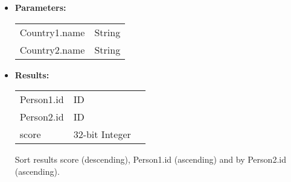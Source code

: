 {\begin{enumerate}
\begin{itemize}
                   \begin{itemize}
                     
                     \item  p1 has left a Comment on p2's Comment or post, this has the score 4
                     \item  p1 has created a post or comment that was commented by p2, this has the score 1
                     \item  p1 and p2 are friends, score 15
                     \item  p1 liked a post or comment by p2, score 10
                     \item  p1 has created a post or comment that was liked by p2, score 1 

                       For all pairs of people (p1, p2) such that p1 is in some city
                       of country X and p2 is anywhere in country Y, find the pairs
                       with the largest communication score (one pair per any city
                       in country X)
                   \end{itemize}
                \item \textbf{Parameters:} \\
                    \begin{tabular}{ll}
                      Country1.name & String \\
                      Country2.name & String \\
                    \end{tabular}
                \item \textbf{Results:} \\
                    \begin{tabular}{lll}
                      Person1.id & ID & \\
                      Person2.id & ID & \\
                      score & 32-bit Integer & \\
                    \end{tabular}

                    Sort results score (descending), Person1.id (ascending) and by Person2.id (ascending).
                    \end{itemize}


\end{enumerate}}
